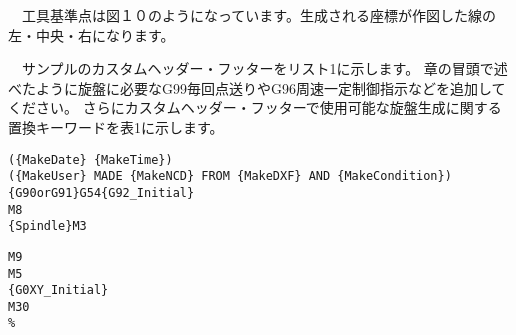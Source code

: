 \begin{itemize}

　工具基準点は図１０のようになっています。生成される座標が作図した線の左・中央・右になります。
\end{itemize}

　サンプルのカスタムヘッダー・フッターをリスト1に示します。
章の冒頭で述べたように旋盤に必要なG99毎回点送りやG96周速一定制御指示などを追加してください。
さらにカスタムヘッダー・フッターで使用可能な旋盤生成に関する置換キーワードを表1に示します。

\begin{minipage}[t]{0.75\textwidth}
\begin{lstlisting}[caption=Header.txt,numbers=none,label=lst:header.txt]
%
({MakeDate} {MakeTime})
({MakeUser} MADE {MakeNCD} FROM {MakeDXF} AND {MakeCondition})
{G90orG91}G54{G92_Initial}
M8
{Spindle}M3
\end{lstlisting}
\end{minipage}
\begin{minipage}[t]{0.25\textwidth}
\begin{lstlisting}[caption=Footer.txt,numbers=none,label=lst:footer.txt]
M9
M5
{G0XY_Initial}
M30
%
\end{lstlisting}
\end{minipage}

